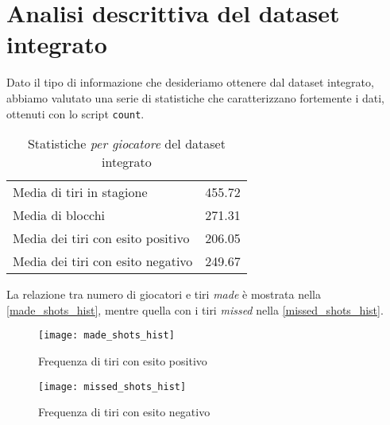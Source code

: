 \pagebreak
\section{Analisi descrittiva del dataset integrato}

Dato il tipo di informazione che desideriamo ottenere dal dataset integrato, abbiamo valutato una serie di statistiche che caratterizzano fortemente i dati, ottenuti con lo script \texttt{count}.

\begin{table}[h!]
\centering
	\begin{tabular}{l l} 
	 
		Media di tiri in stagione& 455.72 \\
		Media di blocchi& 271.31 \\
		Media dei tiri con esito positivo& 206.05\\
		Media dei tiri con esito negativo& 249.67\\
		\end{tabular}
		\caption{Statistiche \textit{per giocatore} del dataset integrato}
\end{table}

La relazione tra numero di giocatori e tiri \textit{made} è mostrata nella \autoref{made_shots_hist}, mentre quella con i tiri \textit{missed} nella \autoref{missed_shots_hist}.

\begin{figure}[H]
\caption{Frequenza di tiri con esito positivo}
\label{made_shots_hist}
\texttt{[image: made\_shots\_hist]}
\end{figure}

\begin{figure}[H]
\caption{Frequenza di tiri con esito negativo}
\label{missed_shots_hist}
\texttt{[image: missed\_shots\_hist]}
\end{figure}
